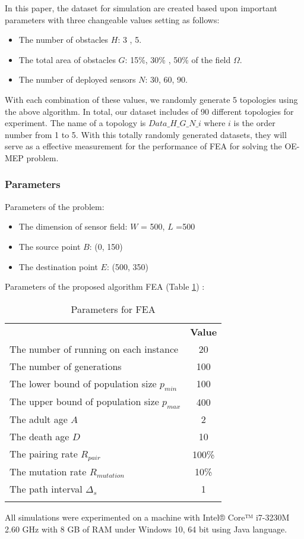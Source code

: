 \documentclass[final]{elsarticle}
\begin{document}
In this paper, the dataset for simulation are created based upon important parameters with three changeable values setting as follows:
\begin{itemize}
	\item The number of obstacles $H$: 3 , 5.
	\item The total area of obstacles $G$: 15\%, 30\% , 50\% of the field $\Omega$.
	\item The number of deployed sensors $N$: 30, 60, 90.
\end{itemize}
With each combination of these values, we randomly generate 5 topologies using the above algorithm. In total, our dataset includes of 90 different topologies for experiment. The name of a topology is $Data\_H\_G\_N\_i$ where $ i $ is the order number from 1 to 5. With this totally randomly generated datasets, they will serve as a effective measurement for the performance of FEA for solving the OE-MEP problem. 

\subsubsection{Parameters}
Parameters of the problem:
\begin{itemize}
	\item The dimension of sensor field: $ W $ = 500, $ L $ =500
	\item The source point $ B $: (0, 150) 
	\item The destination point $ E $: (500, 350)	
\end{itemize}
Parameters of the proposed algorithm FEA (Table \ref{tab1}) :
\begin{table}
	\caption{Parameters for FEA}
	\label{tab1}       %
	\begin{center}
		\renewcommand{\arraystretch}{1.5}
		\begin{tabular}{lc}
			\hline\noalign{\smallskip}
			\multicolumn{1}{c}{\textbf{Parameter}} & \textbf{Value} \\
			\noalign{\smallskip}\hline\noalign{\smallskip}
			The number of running on each instance & 20 \\
			The number of generations & 100\\
			The lower bound of population size $ p_{min} $ & 100\\
			The upper bound of population size $ p_{max} $ & 400\\
			The adult age $A$ & 2 \\
			The death age $D$ & 10 \\
			The pairing rate $ R_{pair}$  & 100\% \\
			The mutation rate $ R_{mutation} $ & 10\% \\
			The path interval $\Delta_s$ & 1 \\ 
			\noalign{\smallskip} \hline
		\end{tabular}
	\end{center}
\end{table}
All simulations were experimented on a machine with Intel® Core™ i7-3230M 2.60 GHz with 8 GB of RAM under Windows 10, 64 bit using Java language.
\end{document}
